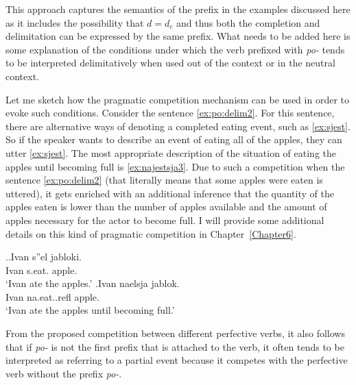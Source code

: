 This approach captures the semantics of the prefix in the examples discussed here as it includes the possibility that $d = d_c$ and thus both the completion and delimitation can be expressed by the same prefix. What needs to be added here is some explanation of the conditions under which the verb prefixed with \textit{po-} tends to be interpreted delimitatively when used out of the context or in the neutral context.

Let me sketch how the pragmatic competition mechanism can be used in order to evoke such conditions. Consider the sentence \ref{ex:po:delim2}. For this sentence, there are alternative ways of denoting a completed eating event, such as \ref{ex:sjest}. So if the speaker wants to describe an event of eating all of the apples, they can utter \ref{ex:sjest}. The most appropriate description of the situation of eating the apples until becoming full is \ref{ex:najestsja3}. Due to such a competition when the sentence \ref{ex:po:delim2} (that literally means that some apples were eaten is uttered), it gets enriched with an additional inference that the quantity of the apples eaten is lower than the number of apples available and the amount of apples necessary for the actor to become full. I will provide some additional details on this kind of pragmatic competition in Chapter~\ref{Chapter6}.

\ex.\ag.\label{ex:sjest}Ivan s''el jabloki.\\
Ivan s.eat. apple.\\
\trans `Ivan ate the apples.'
\bg.\label{ex:najestsja3}Ivan naelsja jablok.\\
Ivan na.eat..refl apple.\\
\trans `Ivan ate the apples until becoming full.'

From the proposed competition between different perfective verbs, it also follows that if \textit{po-} is not the first prefix that is attached to the verb, it often tends to be interpreted as referring to a partial event because it competes with the perfective verb without the prefix \textit{po-}.



